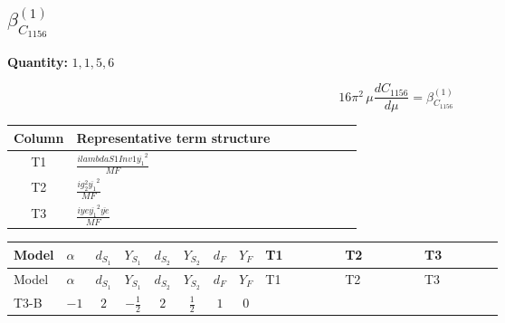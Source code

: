 \documentclass[8pt]{article}
\begin{document}
\begin{landscape}
\section*{$\beta_{C_{1156}}^{(1)}$}
\noindent\textbf{Quantity: }$\mathrm{1,1,5,6}$\par\smallskip
\[16\pi^2\,\mu\frac{d C_{1156}}{d\mu}=\beta_{C_{1156}}^{(1)}\]
\begin{center}
\begin{tabular}{@{}c >{\raggedright\arraybackslash}p{0.82\linewidth}@{}}
\toprule
Column & Representative term structure \\
\midrule
T1 & \(\displaystyle \frac{i lambdaS1Inv1 \overline{y_{1}}^{2}}{MF}\) \\
\midrule
T2 & \(\displaystyle \frac{i g_{2}^{2} \overline{y_{1}}^{2}}{MF}\) \\
\midrule
T3 & \(\displaystyle \frac{i ye \overline{y_{1}}^{2} \overline{ye}}{MF}\) \\
\midrule
\bottomrule
\end{tabular}
\end{center}
\smallskip
\tiny
\begin{longtable}{@{}llcccccc >{\raggedright\arraybackslash}p{0.21\linewidth} >{\raggedright\arraybackslash}p{0.21\linewidth} >{\raggedright\arraybackslash}p{0.21\linewidth}@{}}
\toprule
Model & $\alpha$ & $d_{S_1}$ & $Y_{S_1}$ & $d_{S_2}$ & $Y_{S_2}$ & $d_F$ & $Y_F$ & T1 & T2 & T3 \\
\midrule
\endfirsthead
\toprule
Model & $\alpha$ & $d_{S_1}$ & $Y_{S_1}$ & $d_{S_2}$ & $Y_{S_2}$ & $d_F$ & $Y_F$ & T1 & T2 & T3 \\
\midrule
\endhead
T3-B & $-1$ & $2$ & $-\frac{1}{2}$ & $2$ & $\frac{1}{2}$ & $1$ & $0$ & \scriptsize\adjustbox{max width=\linewidth}{$\begin{gathered} \frac{i lambdaS1Inv1 \overline{y_{1}}^{2}}{2 MF}\end{gathered}$} & \scriptsize\adjustbox{max width=\linewidth}{$\begin{gathered} \frac{3 i g_{2}^{2} \overline{y_{1}}^{2}}{4 MF}\end{gathered}$} & \scriptsize\adjustbox{max width=\linewidth}{$\begin{gathered} - \frac{i ye \overline{y_{1}}^{2} \overline{ye}}{4 MF}\end{gathered}$} \\
\midrule
\bottomrule
\end{longtable}
\clearpage

\end{landscape}
\end{document}
